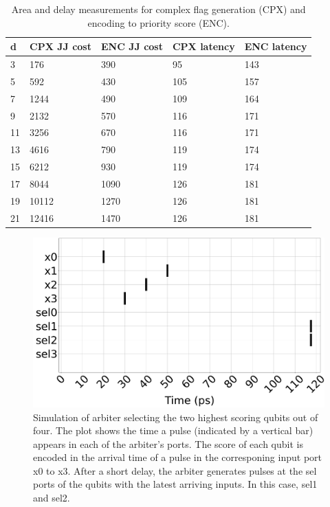 \begin{table}[]
\caption{Area and delay measurements for complex flag generation (CPX) and encoding to priority score (ENC).}
\label{tab:encoderstats}
\begin{tabularx}{\columnwidth}{|p{}|X|X|X|X|}
\hline
d  & CPX JJ cost & ENC JJ cost & CPX latency & ENC latency \\ \hline
3  & 176         & 390         & 95          & 143         \\ \hline
5  & 592         & 430         & 105         & 157         \\ \hline
7  & 1244        & 490         & 109         & 164         \\ \hline
9  & 2132        & 570         & 116         & 171         \\ \hline
11 & 3256        & 670         & 116         & 171         \\ \hline
13 & 4616        & 790         & 119         & 174         \\ \hline
15 & 6212        & 930         & 119         & 174         \\ \hline
17 & 8044        & 1090        & 126         & 181         \\ \hline
19 & 10112       & 1270        & 126         & 181         \\ \hline
21 & 12416       & 1470        & 126         & 181         \\ \hline
\end{tabularx}
\vspace{-\baselineskip}
\end{table}


\begin{figure}
  \begin{center}
    \includegraphics[width=\columnwidth]{figures/simlarge.pdf}
  \end{center}
  \caption{Simulation of arbiter selecting the two highest scoring qubits out of four. The plot shows the time a pulse (indicated by a vertical bar) appears in each of the arbiter's ports. The score of each qubit is encoded in the arrival time of a pulse in the corresponing input port x0 to x3. After a short delay, the arbiter generates pulses at the sel ports of the qubits with the latest arriving inputs. In this case, sel1 and sel2.}\label{fig:pylserun}
\end{figure}


